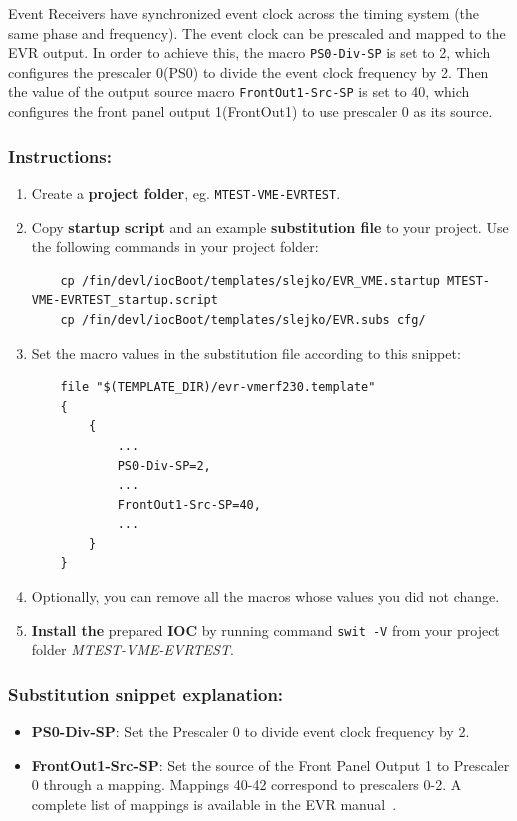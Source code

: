 \documentclass[12pt,a4paper]{article}
\begin{document}
Event Receivers have synchronized event clock across the timing system (the same phase and frequency). The event clock can be prescaled and mapped to the EVR output. In order to achieve this, the macro \texttt{PS0-Div-SP} is set to 2, which configures the prescaler 0(PS0) to divide the event clock frequency by 2. Then the value of the output source macro \texttt{FrontOut1-Src-SP} is set to 40, which configures the front panel output 1(FrontOut1) to use prescaler 0 as its source.

\subsubsection{Instructions:}
\begin{enumerate}
	\item Create a \textbf{project folder}, eg. \texttt{MTEST-VME-EVRTEST}.
	\item Copy \textbf{startup script} and an example \textbf{substitution file} to your project. Use the following commands in your project folder:
\begin{lstlisting}
	cp /fin/devl/iocBoot/templates/slejko/EVR_VME.startup MTEST-VME-EVRTEST_startup.script
	cp /fin/devl/iocBoot/templates/slejko/EVR.subs cfg/
\end{lstlisting}

	\item Set the macro values in the substitution file according to this snippet:
\begin{lstlisting}
	file "$(TEMPLATE_DIR)/evr-vmerf230.template"
	{
		{
			...
			PS0-Div-SP=2,
			...
			FrontOut1-Src-SP=40,
			...
		}
	}
\end{lstlisting}

	\item Optionally, you can remove all the macros whose values you did not change. 
	\item \textbf{Install the} prepared \textbf{IOC} by running command \texttt{swit -V} from your project folder \textit{MTEST-VME-EVRTEST}.
\end{enumerate}

\subsubsection{Substitution snippet explanation:}
\begin{itemize}
	\item \textbf{PS0-Div-SP}: Set the Prescaler 0 to divide event clock frequency by 2.
	\item \textbf{FrontOut1-Src-SP}: Set the source of the Front Panel Output 1  to Prescaler 0 through a mapping. Mappings 40-42 correspond to prescalers 0-2. A complete list of mappings is available in the EVR manual~\cite{evr_manual}.
\end{itemize}
\end{document}
